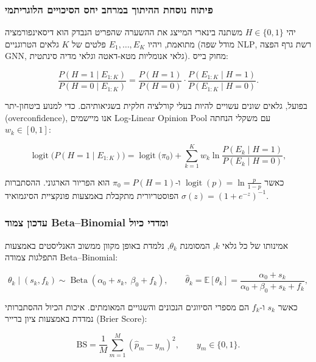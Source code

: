 \subsubsection{פיתוח נוסחת ההיתוך במרחב יחס הסיכויים הלוגריתמי}
יהי $H \in \{0, 1\}$ משתנה בינארי המייצג את ההשערה שהפריט הנבדק הוא דיסאינפורמציה מתואמת, ויהיו $E_1, \dots, E_K$ פלטים של $K$ גלאים הטרוגניים (מודל שפה \textenglish{NLP}, רשת גרף הפצה \textenglish{GNN}, גלאי אנומליות מטא-דאטה וגלאי מדיה סינתטית). מחוק בייס:
\begin{english}
\begin{equation}
\frac{P(H=1 \mid E_{1:K})}{P(H=0 \mid E_{1:K})} = \frac{P(H=1)}{P(H=0)} \cdot \frac{P(E_{1:K} \mid H=1)}{P(E_{1:K} \mid H=0)}.
\label{eq:bayes-odds}
\end{equation}
\end{english}
בפועל, גלאים שונים עשויים להיות בעלי קורלציה חלקית בשגיאותיהם. כדי למנוע ביטחון-יתר (\textenglish{overconfidence}), אנו מיישמים \textenglish{Log-Linear Opinion Pool} עם משקלי הנחתה $w_k \in [0,1]$:
\begin{english}
\begin{equation}
\operatorname{logit}\!\big(P(H=1 \mid E_{1:K})\big)
= \operatorname{logit}\!\big(\pi_0\big) + \sum_{k=1}^{K} w_k \ln \frac{P(E_k \mid H=1)}{P(E_k \mid H=0)},
\label{eq:bayes-logodds}
\end{equation}
\end{english}
כאשר $\operatorname{logit}(p) = \ln\frac{p}{1-p}$ ו-$\pi_0 = P(H=1)$ הוא הפריור הארגוני. ההסתברות הפוסטריורית מתקבלת באמצעות פונקציית הסיגמואיד $\sigma(z) = (1+e^{-z})^{-1}$.

\subsubsection{עדכון צמוד \textenglish{Beta--Binomial} ומדדי כיול}
אמינותו של כל גלאי $k$, המסומנת $\theta_k$, נלמדת באופן מקוון ממשוב האנליסטים באמצעות התפלגות צמודה \textenglish{Beta--Binomial}:
\begin{english}
\begin{equation}
\theta_k \mid (s_k, f_k) \sim \operatorname{Beta}(\alpha_0 + s_k,\; \beta_0 + f_k), \qquad
\hat{\theta}_k = \mathbb{E}[\theta_k] = \frac{\alpha_0 + s_k}{\alpha_0 + \beta_0 + s_k + f_k},
\label{eq:beta-update}
\end{equation}
\end{english}
כאשר $s_k$ ו-$f_k$ הם מספרי הסיווגים הנכונים והשגויים המאומתים. איכות הכיול ההסתברותי נמדדת באמצעות ציון ברייר (\textenglish{Brier Score}):
\begin{english}
\begin{equation}
\text{BS} = \frac{1}{M} \sum_{m=1}^{M} \left(\hat{p}_m - y_m\right)^2, \qquad y_m \in \{0,1\}.
\label{eq:brier}
\end{equation}
\end{english}

